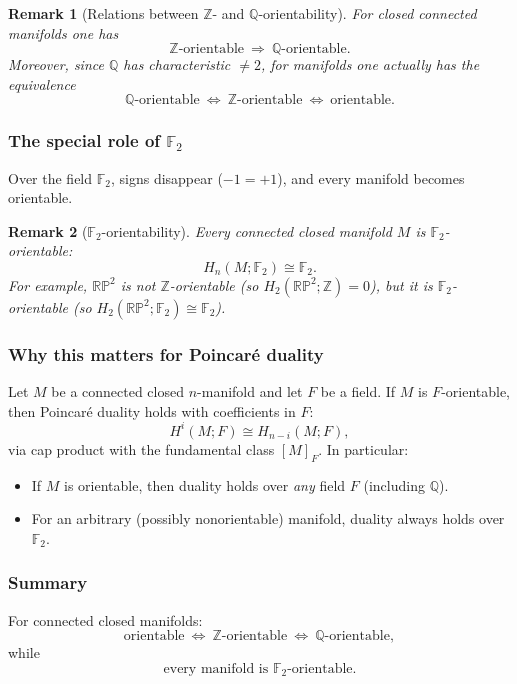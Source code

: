 \documentclass[12pt,a4paper]{article}
\theoremstyle{notespace}
\newtheorem{remark}{Remark}[section]
\begin{document}
\begin{remark}[Relations between \(\mathbb Z\)- and \(\mathbb Q\)-orientability]
	For closed connected manifolds one has
	\[
	\mathbb Z\text{-orientable}\ \Longrightarrow\ \mathbb Q\text{-orientable}.
	\]
	Moreover, since \(\mathbb Q\) has characteristic \(\neq 2\), for manifolds one actually has the equivalence
	\[
	\mathbb Q\text{-orientable}\ \Longleftrightarrow\ \mathbb Z\text{-orientable}\ \Longleftrightarrow\ \text{orientable}.
	\]
\end{remark}

\subsubsection{The special role of \(\mathbb F_2\)}
Over the field \(\mathbb F_2\), signs disappear (\(-1=+1\)), and every manifold becomes orientable.

\begin{remark}[\(\mathbb F_2\)-orientability]
	Every connected closed manifold \(M\) is \(\mathbb F_2\)-orientable:
	\[
	H_n(M;\mathbb F_2)\cong \mathbb F_2.
	\]
	For example, \(\mathbb{RP}^2\) is not \(\mathbb Z\)-orientable (so \(H_2(\mathbb{RP}^2;\mathbb Z)=0\)),
	but it is \(\mathbb F_2\)-orientable (so \(H_2(\mathbb{RP}^2;\mathbb F_2)\cong \mathbb F_2\)).
\end{remark}

\subsubsection{Why this matters for Poincar\'e duality}
Let \(M\) be a connected closed \(n\)-manifold and let \(F\) be a field.
If \(M\) is \(F\)-orientable, then Poincar\'e duality holds with coefficients in \(F\):
\[
H^i(M;F)\cong H_{n-i}(M;F),
\]
via cap product with the fundamental class \([M]_F\).
In particular:
\begin{itemize}
	\item If \(M\) is orientable, then duality holds over \emph{any} field \(F\) (including \(\mathbb Q\)).
	\item For an arbitrary (possibly nonorientable) manifold, duality always holds over \(\mathbb F_2\).
\end{itemize}

\subsubsection{Summary}
For connected closed manifolds:
\[
\text{orientable}\ \Longleftrightarrow\ \mathbb Z\text{-orientable}\ \Longleftrightarrow\ \mathbb Q\text{-orientable},
\]
while
\[
\text{every manifold is } \mathbb F_2\text{-orientable}.
\]
\end{document}
